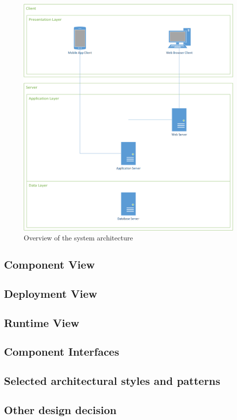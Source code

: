 \begin{figure}
	\includegraphics[width=\textwidth, height=\textheight, keepaspectratio=true]{Img/Overview}
	\caption{Overview of the system architecture}
	\label{fig:overview}
\end{figure}




\clearpage
\subsection{Component View}

\clearpage
\subsection{Deployment View}

\clearpage
\subsection{Runtime View}

\clearpage
\subsection{Component Interfaces}

\clearpage
\subsection{Selected architectural styles and patterns}

\clearpage
\subsection{Other design decision}